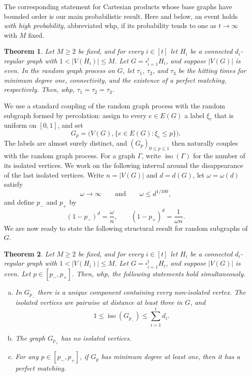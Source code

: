 \documentclass[notitlepage]{scrartcl}
\newtheorem{theorem}{Theorem}
\newcommand{\whp}{whp}
\newcommand{\iso}{\operatorname{iso}}
\begin{document}
The corresponding statement for Cartesian products whose base graphs have bounded order is our main probabilistic result. Here and below, an event holds \emph{with high probability}, abbreviated \whp, if its probability tends to one as $t\to\infty$ with $M$ fixed.

\begin{theorem}\label{th:hitting-time}
Let $M\ge2$ be fixed, and for every $i\in[t]$ let $H_i$ be a connected $d_i$-regular graph with $1<|V(H_i)|\le M$.
Let $G=\square_{i=1}^tH_i$, and suppose $|V(G)|$ is even.
In the random graph process on $G$, let $\tau_1$, $\tau_2$, and $\tau_3$ be the hitting times for minimum degree one, connectivity, and the existence of a perfect matching, respectively.
Then, \whp, $  \tau_1=\tau_2=\tau_3$.
\end{theorem}

We use a standard coupling of the random graph process with the random subgraph formed by percolation: assign to every $e\in E(G)$ a label $\xi_e$ that is uniform on $[0,1]$, and set
\[
  G_p=\bigl(V(G),\{e\in E(G):\xi_e\le p\}\bigr).
\]
The labels are almost surely distinct, and $(G_p)_{0\le p\le1}$ then naturally couples with the random graph process.
%
For a graph $\Gamma$, write $\iso(\Gamma)$ for the number of its isolated vertices.
We work on the following interval around the disappearance of the last isolated vertices.
Write $n=|V(G)|$ and $d=d(G)$, let $\omega=\omega(d)$ satisfy
\[
  \omega\to \infty
  \qquad\text{and}\qquad
  \omega\le d^{1/100},
\]
and define $p_-$ and $p_+$ by
\begin{equation}\label{eq:window}
  (1-p_-)^d=\frac{\omega}{n},
  \qquad
  (1-p_+)^d=\frac{1}{\omega n}.
\end{equation}
We are now ready to state the following structural result for random subgraphs of $G$.
\begin{theorem}\label{th:window-connectivity}
Let $M\ge2$ be fixed, and for every $i\in[t]$ let $H_i$ be a connected $d_i$-regular graph with $1<|V(H_i)|\le M$.
Let $G=\square_{i=1}^tH_i$, and suppose $|V(G)|$ is even. Let $p \in [p_-, p_+]$.  Then, \whp, the following statements hold simultaneously.
\begin{enumerate}[(a)]
  \item In $G_{p_-}$ there is a unique component containing every non-isolated vertex. The isolated vertices are pairwise at distance at least three in $G$, and
  \[
    1\le \iso(G_{p_-})\le \sum_{i=1}^td_i.
  \]
  \item The graph $G_{p_+}$ has no isolated vertices.
  \item For any $p\in [p_-, p_+]$, if $G_p$ has minimum degree at least one, then it has a perfect matching. 
\end{enumerate}
\end{theorem}
\end{document}
